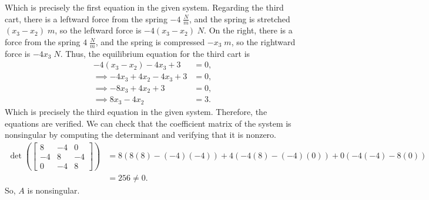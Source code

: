 \documentclass{report}
\begin{document}
    Which is precisely the first equation in the given system.
    \bigbreak \noindent 
    Regarding the third cart, there is a leftward force from the spring $-4 \; \frac{N}{m}$, and the spring is stretched $ (x_{3} - x_{2})\; m$, so the leftward force is $-4(x_{3} - x_{2}) \; N $. On the right, there is a force from the spring $4 \; \frac{N}{m}$, and the spring is compressed $-x_{3} \; m$, so the rightward force is $-4x_{3} \; N$. Thus, the equilibrium equation for the third cart is
    \begin{align*}
        -4(x_{3} - x_{2}) - 4x_{3} + 3 &= 0, \\
        \implies -4x_{3} + 4x_{2} -4x_{3} + 3 &= 0, \\
        \implies -8x_{3} + 4x_{2} + 3 &= 0, \\
        \implies 8x_{3} - 4x_{2} &= 3
    .\end{align*}
    Which is precisely the third equation in the given system.
    \bigbreak \noindent 
    Therefore, the equations are verified.
    \bigbreak \noindent 
    We can check that the coefficient matrix of the system is nonsingular by computing the determinant and verifying that it is nonzero.
    \begin{align*}
        \det\left( \begin{bmatrix} 8 & -4 & 0 \\ -4 & 8 & -4 \\ 0 & -4 & 8 \end{bmatrix}\right) &= 8(8(8) - (-4)(-4)) +4(-4(8) - (-4)(0)) + 0 (-4(-4)-8(0)) \\
                               &=256 \ne 0
    .\end{align*}
    So, $A$ is nonsingular.
\end{document}
